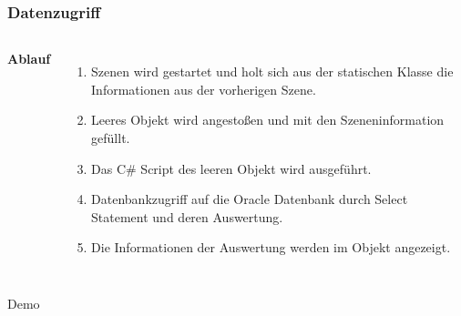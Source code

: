 \documentclass{beamer}
\begin{document}

\begin{frame}
\frametitle{Datenzugriff}
\begin{adjustbox}{totalheight=\baselineskip}
\begin{columns}[c] %


\textbf{Ablauf}
\begin{enumerate}
\item Szenen wird gestartet und holt sich aus der statischen Klasse die Informationen aus der vorherigen Szene.
\item Leeres Objekt wird angestoßen und mit den Szeneninformation gefüllt.
\item Das C\# Script des leeren Objekt wird ausgeführt.
\item Datenbankzugriff auf die Oracle Datenbank durch Select Statement und deren Auswertung.
\item Die Informationen der Auswertung werden im Objekt angezeigt.
\end{enumerate}



\end{columns}
\end{adjustbox}
\end{frame}


\begin{frame}
\Huge{\centerline{Demo}}
\end{frame}
\end{document}
